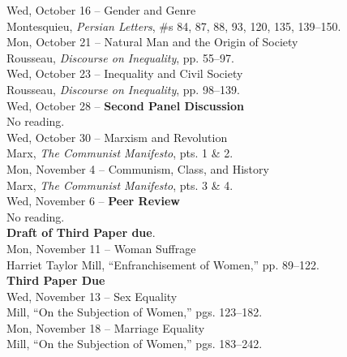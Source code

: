 \documentclass [11pt]{article}
\begin{document}
\noindent
Wed, October 16 --  Gender and Genre \\ 
\phantom{Wed, October 16 -- }Montesquieu, \textit{Persian Letters}, \#s  84, 87, 88, 93, 120, 135, 139--150. \\

\noindent
Mon, October 21 -- Natural Man and the Origin of Society \\
\phantom{Mon, October 21 -- }Rousseau, \textit{Discourse on Inequality}, pp. 55--97.\\

\noindent
Wed, October 23 -- Inequality and Civil Society  \\
\phantom{Mon, October 23 -- }Rousseau, \textit{Discourse on Inequality}, pp. 98--139.\\

\noindent
Wed, October 28 -- \textbf{Second Panel Discussion} \\
\phantom{Wed, October 28 -- }No reading. \\

\noindent
Wed, October 30 -- Marxism and Revolution \\
\phantom{Wed, October 30 -- }Marx, \textit{The Communist Manifesto}, pts. 1 \& 2. \\

\noindent
Mon, November 4 -- Communism, Class, and History \\
\phantom{Mon, November 4 -- }Marx, \textit{The Communist Manifesto}, pts. 3 \& 4. \\

Wed, November 6 -- \textbf{Peer Review} \\
\phantom{Wed, November 6 -- }No reading. \\
\phantom{Wed, November 6 -- }\textbf{Draft of Third Paper due}. \\

\noindent
Mon, November 11 -- Woman Suffrage \\
\phantom{Mon, November 11 -- }Harriet Taylor Mill, ``Enfranchisement of Women,'' pp. 89--122. \\
\phantom{Mon, November 11 -- }\textbf{Third Paper Due} \\

\noindent
Wed, November 13 -- Sex Equality \\
\phantom{Wed, November 13 -- }Mill, ``On the Subjection of Women,'' pgs. 123--182. \\

\noindent
Mon, November 18 -- Marriage Equality \\
\phantom{Mon, November 18 -- }Mill, ``On the Subjection of Women,'' pgs. 183--242. \\
\end{document}
